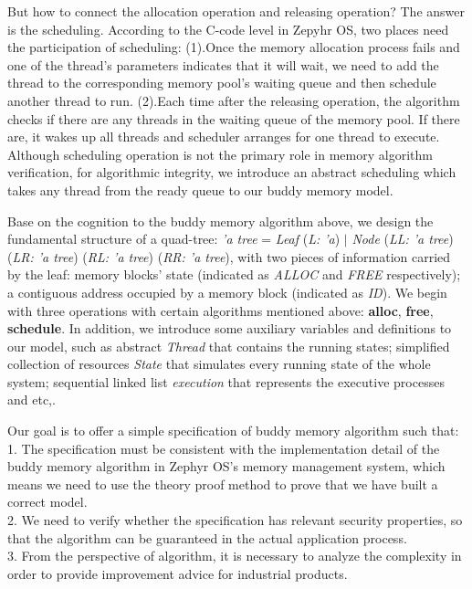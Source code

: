 \documentclass[runningheads]{llncs}
\begin{document}
But how to connect the allocation operation and releasing operation? The answer is the scheduling. According to the C-code level in Zepyhr OS, two places need the participation of scheduling: (1).Once the memory allocation process fails and one of the thread's parameters indicates that it will wait, we need to add the thread to the corresponding memory pool's waiting queue and then schedule another thread to run. (2).Each time after the releasing operation, the algorithm checks if there are any threads in the waiting queue of the memory pool. If there are, it wakes up all threads and scheduler arranges for one thread to execute. Although scheduling operation is not the primary role in memory algorithm verification, for algorithmic integrity, we introduce an abstract scheduling which takes any thread from the ready queue to our buddy memory model.

Base on the cognition to the buddy memory algorithm above, we design the fundamental structure of a quad-tree: \textsl{'a tree} = \textsl{Leaf} (\textsl{L: 'a}) $\mid$ \textsl{Node} (\textsl{LL: 'a tree}) (\textsl{LR: 'a tree}) (\textsl{RL: 'a tree}) (\textsl{RR: 'a tree}), with two pieces of information carried by the leaf: memory blocks' state (indicated as \textsl{ALLOC} and \textsl{FREE} respectively); a contiguous address occupied by a memory block (indicated as \textsl{ID}). We begin with three operations with certain algorithms mentioned above: \textbf{alloc}, \textbf{free}, \textbf{schedule}. In addition, we introduce some auxiliary variables and definitions to our model, such as abstract \textsl{Thread} that contains the running states; simplified collection of resources \textsl{State} that simulates every running state of the whole system; sequential linked list \textsl{execution} that represents the executive processes and etc,. 

Our goal is to offer a simple specification of buddy memory algorithm such that: \\
\phantom{x} 1. The specification must be consistent with the implementation detail of the buddy memory algorithm in Zephyr OS's memory management system, which means we need to use the theory proof method to prove that we have built a correct model. \\
\phantom{x} 2. We need to verify whether the specification has relevant security properties, so that the algorithm can be guaranteed in the actual application process. \\
\phantom{x} 3. From the perspective of algorithm, it is necessary to analyze the complexity in order to provide improvement advice for industrial products.
\end{document}
